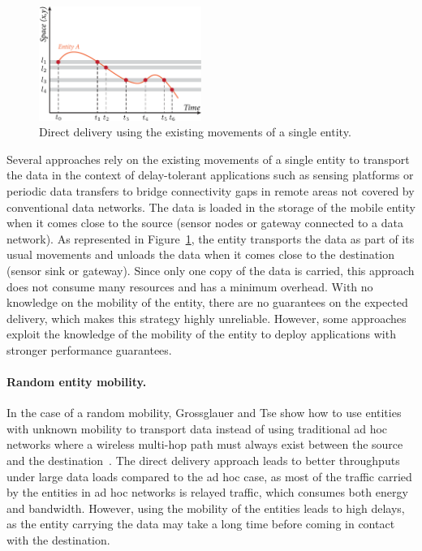 \begin{figure}
    \includegraphics[width=5.3cm]{figures/dtn-direct-forwarding.pdf}
    \caption{Direct delivery using the existing movements of a single entity.}
    \label{fig:dtn-direct-forwarding}
\end{figure}
Several approaches rely on the existing movements of a single entity to transport the data in the context of delay-tolerant applications such as sensing platforms or periodic data transfers to bridge connectivity gaps in remote areas not covered by conventional data networks. The data is loaded in the storage of the mobile entity when it comes close to the source (\eg sensor nodes or gateway connected to a data network). As represented in Figure~\ref{fig:dtn-direct-forwarding}, the entity transports the data as part of its usual movements and unloads the data when it comes close to the destination (\eg sensor sink or gateway). Since only one copy of the data is carried, this approach does not consume many resources and has a minimum overhead. With no knowledge on the mobility of the entity, there are no guarantees on the expected delivery, which makes this strategy highly unreliable. However, some approaches exploit the knowledge of the mobility of the entity to deploy applications with stronger performance guarantees.

\paragraph{Random entity mobility.}
In the case of a random mobility, Grossglauer and Tse show how to use entities with unknown mobility to transport data instead of using traditional ad hoc networks where a wireless multi-hop path must always exist between the source and the destination~\cite{grossglauser2001mobility}. The direct delivery approach leads to better throughputs under large data loads compared to the ad hoc case, as most of the traffic carried by the entities in ad hoc networks is relayed traffic, which consumes both energy and bandwidth. However, using the mobility of the entities leads to high delays, as the entity carrying the data may take a long time before coming in contact with the destination. 

